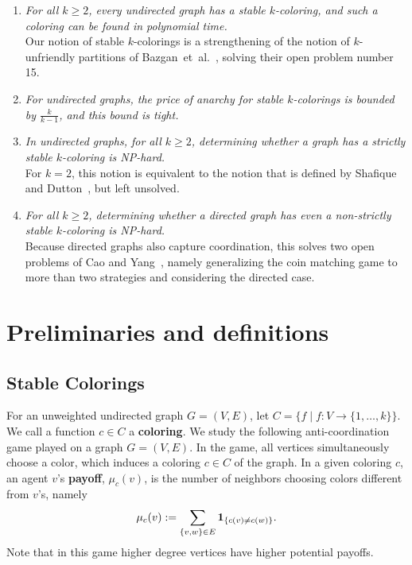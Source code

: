 \begin{enumerate}

\item \emph{For all $k \ge 2$, every undirected graph has a stable
$k$-coloring, and such a coloring can be found in polynomial time.}  \\ Our
notion of stable $k$-colorings is a strengthening of the notion of
$k$-unfriendly partitions of Bazgan~et~al.~\cite{BazganTV10}, solving their
open problem number 15.

\item \emph{For undirected graphs, the price of anarchy for stable
$k$-colorings is bounded by $\frac{k}{k-1}$, and this bound is tight.}

\item \emph{In undirected graphs, for all $k \ge 2$, determining whether a
graph has a strictly stable $k$-coloring is NP-hard.}  \\ For $k=2$, this
notion is equivalent to the notion that is defined by Shafique and
Dutton~\cite{ShafiqueD09}, but left unsolved.

\item \emph{For all $k \ge 2$, determining whether a directed graph has even a
non-strictly stable $k$-coloring is NP-hard.}\\  Because directed graphs also
capture coordination, this solves two open problems of Cao and
Yang~\cite{CaoY12a}, namely generalizing the coin matching game to more than
two strategies and considering the directed case. 

\end{enumerate}

\section{Preliminaries and definitions}

\subsection{Stable Colorings}

For an unweighted undirected graph $G=(V,E)$, let $C = \{f \mid f: V
\to \{1, \ldots ,k \}\}.$ We call a function $c \in C$ a \textbf{coloring}.
We study the following anti-coordination game played on a graph $G=(V,E)$.  In
the game, all vertices simultaneously choose a color, which induces a coloring
$c \in C$ of the graph.  In a given coloring $c$, an agent $v$'s
\textbf{payoff}, $\mu_c(v)$, is the number of neighbors choosing colors
different from $v$'s, namely 
\[ 
   \mu_c(v) := \sum_{\{v,w\} \in E} \textbf{1}_{\left \{ c(v) \neq c(w) \right \}}.  
\] 
Note that in this game higher degree vertices have higher potential payoffs.

